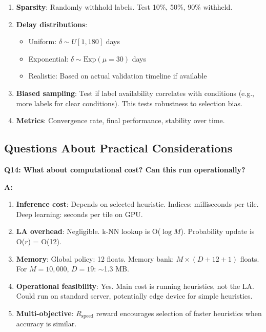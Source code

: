 \documentclass[11pt]{article}
\begin{document}
\begin{enumerate}
    \item \textbf{Sparsity}: Randomly withhold labels. Test 10\%, 50\%, 90\% withheld.

    \item \textbf{Delay distributions}:
    \begin{itemize}
        \item Uniform: $\delta \sim U[1, 180]$ days
        \item Exponential: $\delta \sim \text{Exp}(\mu=30)$ days
        \item Realistic: Based on actual validation timeline if available
    \end{itemize}

    \item \textbf{Biased sampling}: Test if label availability correlates with conditions (e.g., more labels for clear conditions). This tests robustness to selection bias.

    \item \textbf{Metrics}: Convergence rate, final performance, stability over time.
\end{enumerate}

\subsection{Questions About Practical Considerations}

\textbf{Q14: What about computational cost? Can this run operationally?}

\textbf{A:}

\begin{enumerate}
    \item \textbf{Inference cost}: Depends on selected heuristic. Indices: milliseconds per tile. Deep learning: seconds per tile on GPU.

    \item \textbf{LA overhead}: Negligible. k-NN lookup is O($\log M$). Probability update is O($r$) = O(12).

    \item \textbf{Memory}: Global policy: 12 floats. Memory bank: $M \times (D + 12 + 1)$ floats. For $M=10,000$, $D=19$: $\sim$1.3 MB.

    \item \textbf{Operational feasibility}: Yes. Main cost is running heuristics, not the LA. Could run on standard server, potentially edge device for simple heuristics.

    \item \textbf{Multi-objective}: $R_{\text{speed}}$ reward encourages selection of faster heuristics when accuracy is similar.
\end{enumerate}
\end{document}
